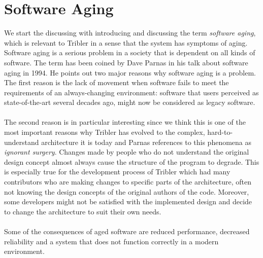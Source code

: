 \section{Software Aging}
We start the discussing with introducing and discussing the term \emph{software aging}, which is relevant to Tribler in a sense that the system has symptoms of aging. Software aging is a serious problem in a society that is dependent on all kinds of software. The term has been coined by Dave Parnas in his talk about software aging in 1994\cite{parnas1994software}. He points out two major reasons why software aging is a problem. The first reason is the lack of movement when software fails to meet the requirements of an always-changing environment: software that users perceived as state-of-the-art several decades ago, might now be considered as legacy software.\\\\
The second reason is in particular interesting since we think this is one of the most important reasons why Tribler has evolved to the complex, hard-to-understand architecture it is today and Parnas references to this phenomena as \emph{ignorant surgery}. Changes made by people who do not understand the original design concept almost always cause the structure of the program to degrade. This is especially true for the development process of Tribler which had many contributors who are making changes to specific parts of the architecture, often not knowing the design concepts of the original authors of the code. Moreover, some developers might not be satisfied with the implemented design and decide to change the architecture to suit their own needs.\\\\
Some of the consequences of aged software are reduced performance, decreased reliability and a system that does not function correctly in a modern environment.

